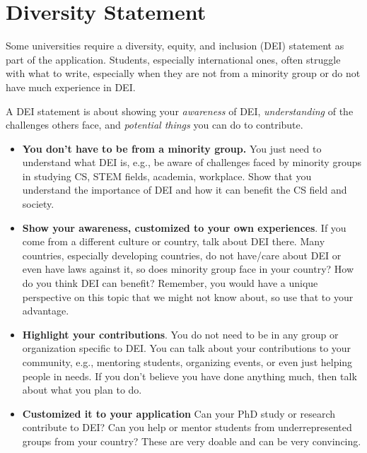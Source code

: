 \documentclass[oneside,11pt,dvipsnames]{book}
\begin{document}
\section{Diversity Statement}\label{sec:diversity-statement}

Some universities require a diversity, equity, and inclusion (DEI) statement as part of the application. Students, especially international ones, often struggle with what to write, especially when they are not from a minority group or do not have much experience in DEI.

A DEI statement is about showing your \emph{awareness} of DEI, \emph{understanding} of the challenges others face, and \emph{potential things} you can do to contribute. 

\begin{itemize}
\item \textbf{You don't have to be from a minority group.} You just need to understand what DEI is, e.g., be aware of challenges faced by minority groups in studying CS, STEM fields, academia, workplace. Show that you understand the importance of DEI and how it can benefit the CS field and society. 

\item \textbf{Show your awareness, customized to your own experiences}. If you come from a different culture or country, talk about DEI there. Many countries, especially developing countries, do not have/care about DEI or even have laws against it, so does minority group face in your country?  How do you think DEI can benefit? Remember, you would have a unique perspective on this topic that we might not know about, so use that to your advantage.

\item \textbf{Highlight your contributions}.  You do not need to be in any group or organization specific to DEI.  You can talk about your contributions to your community, e.g., mentoring students, organizing events, or even just helping people in needs. If you don't believe you have done anything much, then talk about what you plan to do. 

\item \textbf{Customized it to your application} Can your PhD study or research contribute to DEI?  Can you help or mentor students from underrepresented groups from your country?  These are very doable and can be very convincing.  

\end{itemize}
\end{document}
